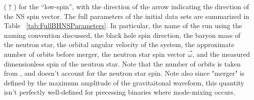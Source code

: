 ($\uparrow$) for the ``low-spin'', with the direction of the arrow
indicating the direction of the NS spin vector. The full parameters of
the initial data sets are summarized in Table
~\ref{tab:FullBHNSParameters}. In particular, the name of the run using the naming convention discussed,
the black hole spin direction, the baryon mass of the neutron star, the orbital angular velocity of the system,
the approximate number of orbits before merger, the neutron star spin vector $\vec{\omega}$, and the measured dimensionless
spin of the neutron star. Note that the number of orbits is taken from \cite{Foucart:2013a}, and doesn't account for the neutron star
spin. Note also since "merger" is defined by the maximum amplitude of the gravitaitonal waveform, this quantity isn't perfectly well-defined
for precessing binaries where mode-mixing occurs.

